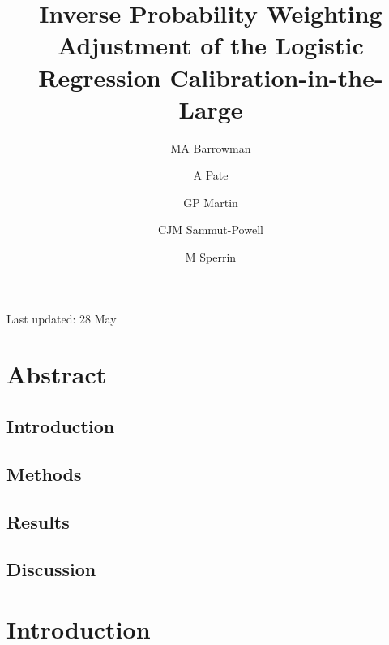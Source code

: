 \documentclass[
]{article}
\title{Inverse Probability Weighting Adjustment of the Logistic Regression Calibration-in-the-Large}
\author{MA Barrowman \and A Pate \and GP Martin \and CJM Sammut-Powell \and M Sperrin}
\date{}
\begin{document}
\maketitle

{
\setcounter{tocdepth}{2}
\tableofcontents
}
Last updated: 28 May

\hypertarget{abstract}{%
\section*{Abstract}\label{abstract}}

\hypertarget{introduction}{%
\subsection*{Introduction}\label{introduction}}

\hypertarget{methods}{%
\subsection*{Methods}\label{methods}}

\hypertarget{results}{%
\subsection*{Results}\label{results}}

\hypertarget{discussion}{%
\subsection*{Discussion}\label{discussion}}

\hypertarget{introduction-1}{%
\section{Introduction}\label{introduction-1}}
\end{document}
